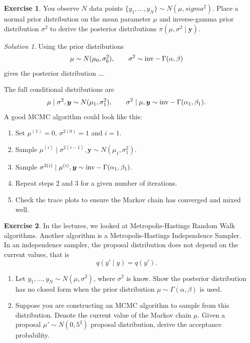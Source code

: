 \documentclass[
]{book}
\providecommand{\tightlist}{%
  \setlength{\itemsep}{0pt}\setlength{\parskip}{0pt}}
\theoremstyle{definition}
\theoremstyle{definition}
\theoremstyle{definition}
\newtheorem{exercise}{Exercise}[chapter]
\theoremstyle{definition}
\theoremstyle{remark}
\newtheorem*{solution}{Solution}
\begin{document}
\begin{exercise}
You observe \(N\) data points \(\{y_1, \ldots, y_N\} \sim N(\mu, sigma^2)\). Place a normal prior distribution on the mean parameter \(\mu\) and inverse-gamma prior distribution \(\sigma^2\) to derive the posterior distributions \(\pi(\mu, \sigma^2 \mid \boldsymbol{y})\).
\end{exercise}

\begin{solution}

Using the prior distributions
\[
\mu \sim N(\mu_0, \sigma_0^2), \qquad \sigma^2 \sim \hbox{inv}-\Gamma(\alpha, \beta)
\]
gives the posterior distribution \ldots.

The full conditional distributions are
\[
\mu \mid \sigma^2, \boldsymbol{y} \sim N(\mu_1, \sigma_1^2), \qquad \sigma^2 \mid \mu,\boldsymbol{y} \sim \hbox{inv}-\Gamma(\alpha_1, \beta_1).
\]
A good MCMC algorithm could look like this:

\begin{enumerate}
\def\labelenumi{\arabic{enumi}.}
\tightlist
\item
  Set \(\mu^{(1)} = 0\), \(\sigma^{2(0)} = 1\) and \(i = 1\).
\item
  Sample \(\mu^{(i)} \mid \sigma^{2(i-1)}, \boldsymbol{y} \sim N(\mu_1, \sigma_1^2)\).
\item
  Sample \(\sigma^{2(i)} \mid \mu^{(i)}, \boldsymbol{y} \sim \hbox{inv}-\Gamma(\alpha_1, \beta_1)\).
\item
  Repeat steps 2 and 3 for a given number of iterations.
\item
  Check the trace plots to ensure the Markov chain has converged and mixed well.
\end{enumerate}

\end{solution}

\begin{exercise}

In the lectures, we looked at Metropolis-Hastings Random Walk algorithms. Another algorithm is a Metropolis-Hastings Independence Sampler. In an independence sampler, the proposal distribution does not depend on the current values, that is
\[
q(y'\mid y) = q(y').
\]

\begin{enumerate}
\def\labelenumi{\arabic{enumi}.}
\tightlist
\item
  Let \(y_1, \ldots, y_N \sim N(\mu, \sigma^2)\), where \(\sigma^2\) is know. Show the posterior distribution has no closed form when the prior distribution \(\mu \sim \Gamma(\alpha, \beta)\) is used.
\item
  Suppose you are constructing an MCMC algorithm to sample from this distribution. Denote the current value of the Markov chain \(\mu\). Given a proposal \(\mu' \sim N(0, 5^2)\) proposal distribution, derive the acceptance probability.
\end{enumerate}

\end{exercise}
\end{document}

